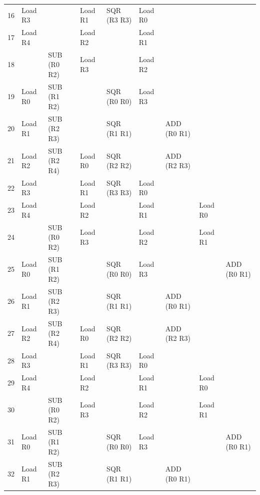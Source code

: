 \begin{table}[b]
{\begin{tabular}{lllllllll}
			16    & Load R3 &               & Load R1 & SQR (R3 R3)   & Load R0 &               &         &  \\
			17    & Load R4 &               & Load R2 &               & Load R1 &               &         &  \\
			18    &         & SUB (R0 R2)   & Load R3 &               & Load R2 &               &         &  \\
			19    & Load R0 & SUB (R1 R2)   &         & SQR (R0 R0)   & Load R3 &               &         &  \\
			20    & Load R1 & SUB (R2 R3)   &         & SQR (R1 R1)   &         & ADD (R0 R1)   &         &  \\
			21    & Load R2 & SUB (R2 R4)   & Load R0 & SQR (R2 R2)   &         & ADD (R2 R3)   &         &  \\
			22    & Load R3 &               & Load R1 & SQR (R3 R3)   & Load R0 &               &         &  \\
			23    & Load R4 &               & Load R2 &               & Load R1 &               & Load R0 &  \\
			24    &         & SUB (R0 R2)   & Load R3 &               & Load R2 &               & Load R1 &  \\
			25    & Load R0 & SUB (R1 R2)   &         & SQR (R0 R0)   & Load R3 &               &         & ADD (R0 R1)   \\
			26    & Load R1 & SUB (R2 R3)   &         & SQR (R1 R1)   &         & ADD (R0 R1)   &         &  \\
			27    & Load R2 & SUB (R2 R4)   & Load R0 & SQR (R2 R2)   &         & ADD (R2 R3)   &         &  \\
			28    & Load R3 &               & Load R1 & SQR (R3 R3)   & Load R0 &               &         &  \\
			29    & Load R4 &               & Load R2 &               & Load R1 &               & Load R0 &  \\
			30    &         & SUB (R0 R2)   & Load R3 &               & Load R2 &               & Load R1 &  \\
			31    & Load R0 & SUB (R1 R2)   &         & SQR (R0 R0)   & Load R3 &               &         & ADD (R0 R1)   \\
			32    & Load R1 & SUB (R2 R3)   &         & SQR (R1 R1)   &         & ADD (R0 R1)   &         &  \\ \bottomrule
		\end{tabular}
	}
\end{table}

